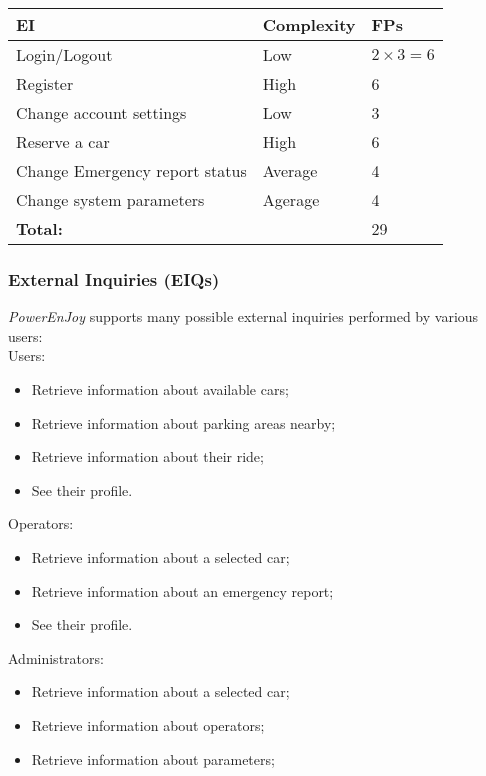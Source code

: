 	\begin{tabular}{|l|l|l|}
		\hline
		\textbf{EI} & \textbf{Complexity} & \textbf{FPs}\\ \hline
		Login/Logout & Low & $2\times3=6$\\ \hline
		Register & High & 6\\ \hline
		Change account settings & Low & 3\\ \hline
		Reserve a car & High & 6\\ \hline
		Change Emergency report status & Average & 4\\ \hline
		Change system parameters & Agerage & 4\\ \hline
		\multicolumn{2}{|l|}{\textbf{Total:}}& 29 \\ \hline
	\end{tabular}


\subsubsection{External Inquiries (EIQs)}
\textit{PowerEnJoy} supports many possible external inquiries performed by various users:\\

Users: \\
	\begin{itemize}
		\item Retrieve information about available cars;
		\item Retrieve information about parking areas nearby;
		\item Retrieve information about their ride;
		\item See their profile.
	\end{itemize}

Operators: \\
	\begin{itemize}
		\item Retrieve information about a selected car;
		\item Retrieve information about an emergency report;
		\item See their profile.
	\end{itemize}
	
Administrators:\\
 	\begin{itemize}
 		\item Retrieve information about a selected car;
 		\item Retrieve information about operators;
 		\item Retrieve information about parameters;
 	\end{itemize}
 	
